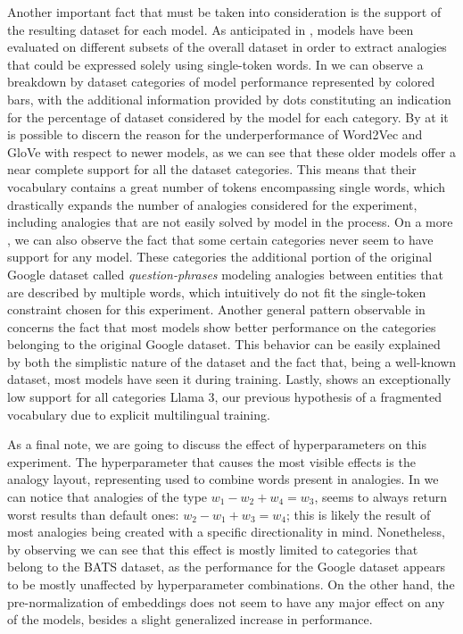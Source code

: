 Another important fact that must be taken into consideration is the support of the resulting dataset for each model.
As anticipated in , models have been evaluated on different subsets of the overall dataset in order to extract analogies that could be expressed solely using single-token words.
In  we can observe a breakdown by dataset categories of model performance represented by colored bars, with the additional information provided by dots constituting an indication for the percentage of dataset considered by the model for each category.
By  at  it is possible to discern the reason for the underperformance of Word2Vec and GloVe with respect to newer models, as we can see that these older models offer a near complete support for all the dataset categories.
This means that their vocabulary contains a great number of tokens encompassing single words, which drastically expands the number of analogies considered for the experiment, including analogies that are not easily solved by model in the process.
On a more , we can also observe the fact that some certain categories never seem to have support for any model.
These categories  the additional portion of the original Google dataset called \emph{question-phrases} modeling analogies between entities that are described by multiple words, which intuitively do not fit the single-token constraint chosen for this experiment.
Another general pattern observable in  concerns the fact that most models show better performance on the categories belonging to the original Google dataset.
This behavior can be easily explained by both the simplistic nature of the dataset and the fact that, being a well-known dataset, most models have seen it during training.
Lastly,  shows an exceptionally low support for all categories  Llama 3,  our previous hypothesis of a fragmented vocabulary due to explicit multilingual training.


As a final note, we are going to discuss the effect of hyperparameters on this experiment.
The hyperparameter that causes the most visible effects is the analogy layout, representing  used to combine words present in analogies.
In  we can notice that analogies of the type $w_1 - w_2 + w_4 = w_3$, seems to always return worst results than default ones: $w_2 - w_1 + w_3 = w_4$; this is likely the result of most analogies being created with a specific directionality in mind.
Nonetheless, by observing  we can see that this effect is mostly limited to categories that belong to the BATS dataset, as the performance for the Google dataset appears to be mostly unaffected by hyperparameter combinations.
On the other hand, the pre-normalization of embeddings does not seem to have any major effect on any of the models, besides a slight generalized increase in performance.

